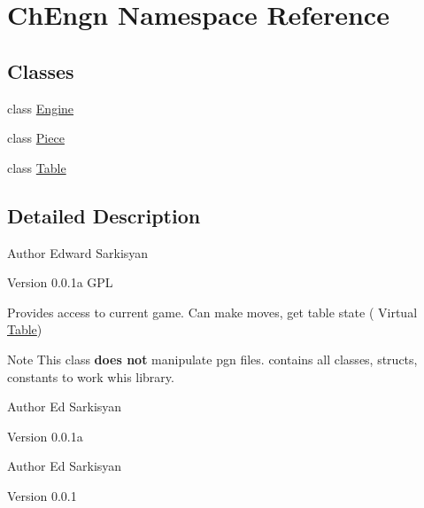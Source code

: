\hypertarget{namespaceChEngn}{
\section{ChEngn Namespace Reference}
\label{namespaceChEngn}
}
\subsection*{Classes}
\begin{DoxyCompactItemize}
\item 
class \hyperlink{classChEngn_1_1Engine}{Engine}
\item 
class \hyperlink{classChEngn_1_1Piece}{Piece}
\item 
class \hyperlink{classChEngn_1_1Table}{Table}
\end{DoxyCompactItemize}


\subsection{Detailed Description}
\begin{DoxyAuthor}{Author}
Edward Sarkisyan 
\end{DoxyAuthor}
\begin{DoxyVersion}{Version}
0.0.1a  GPL
\end{DoxyVersion}
Provides access to current game. Can make moves, get table state ( Virtual \hyperlink{classChEngn_1_1Table}{Table})

\begin{DoxyNote}{Note}
This class {\bfseries does not} manipulate pgn files. contains all classes, structs, constants to work whis library.
\end{DoxyNote}
\begin{DoxyAuthor}{Author}
Ed Sarkisyan 
\end{DoxyAuthor}
\begin{DoxyVersion}{Version}
0.0.1a
\end{DoxyVersion}
\begin{DoxyAuthor}{Author}
Ed Sarkisyan 
\end{DoxyAuthor}
\begin{DoxyVersion}{Version}
0.0.1 
\end{DoxyVersion}
